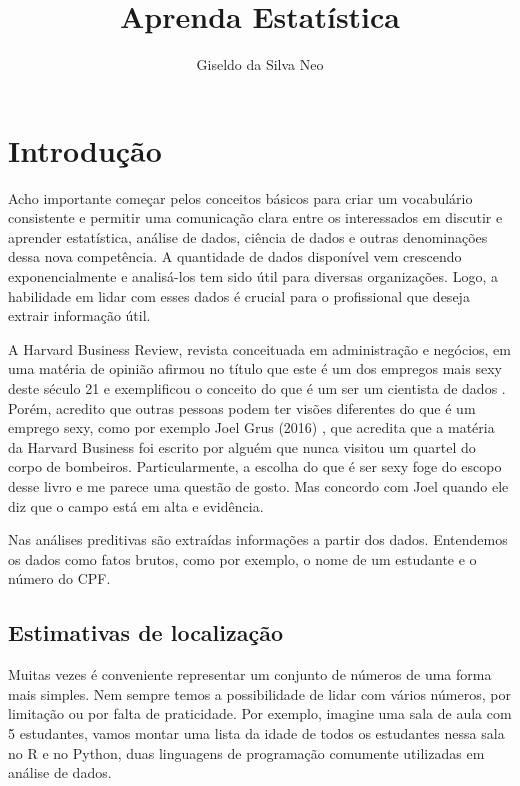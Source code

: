 \documentclass[
]{book}
\title{Aprenda Estatística}
\author{Giseldo da Silva Neo}
\date{}
\begin{document}
\maketitle

{
\setcounter{tocdepth}{1}
\tableofcontents
}
\hypertarget{introduuxe7uxe3o}{%
\chapter{Introdução}\label{introduuxe7uxe3o}}

Acho importante começar pelos conceitos básicos para criar um vocabulário consistente e permitir uma comunicação clara entre os interessados em discutir e aprender estatística, análise de dados, ciência de dados e outras denominações dessa nova competência. A quantidade de dados disponível vem crescendo exponencialmente e analisá-los tem sido útil para diversas organizações. Logo, a habilidade em lidar com esses dados é crucial para o profissional que deseja extrair informação útil.

A Harvard Business Review, revista conceituada em administração e negócios, em uma matéria de opinião afirmou no título que este é um dos empregos mais sexy deste século 21 e exemplificou o conceito do que é um ser um cientista de dados \citep{hbr2012}. Porém, acredito que outras pessoas podem ter visões diferentes do que é um emprego sexy, como por exemplo Joel Grus (2016) \citep{grus2016}, que acredita que a matéria da Harvard Business foi escrito por alguém que nunca visitou um quartel do corpo de bombeiros. Particularmente, a escolha do que é ser sexy foge do escopo desse livro e me parece uma questão de gosto. Mas concordo com Joel quando ele diz que o campo está em alta e evidência.

Nas análises preditivas são extraídas informações a partir dos dados. Entendemos os dados como fatos brutos, como por exemplo, o nome de um estudante e o número do CPF.

\hypertarget{estimativas-de-localizauxe7uxe3o}{%
\section{Estimativas de localização}\label{estimativas-de-localizauxe7uxe3o}}

Muitas vezes é conveniente representar um conjunto de números de uma forma mais simples. Nem sempre temos a possibilidade de lidar com vários números, por limitação ou por falta de praticidade. Por exemplo, imagine uma sala de aula com 5 estudantes, vamos montar uma lista da idade de todos os estudantes nessa sala no R e no Python, duas linguagens de programação comumente utilizadas em análise de dados.
\end{document}
